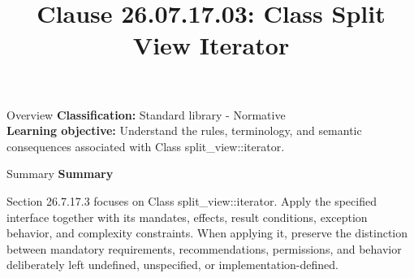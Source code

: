 \documentclass[10pt,letterpaper]{article}
\title{Clause 26.07.17.03: Class Split View Iterator}
\author{}
\date{}
\begin{document}
\maketitle
\begin{CornellOverviewBox}{Overview}
\textbf{Classification:} Standard library - Normative\\[2pt]
\textbf{Learning objective:} Understand the rules, terminology, and semantic consequences associated with Class split\_view::iterator.
\end{CornellOverviewBox}\begin{CornellSummaryBox}{Summary}
{\sffamily\bfseries\color{Accent} Summary}\par\vspace{3pt}Section 26.7.17.3 focuses on Class split\_view::iterator. Apply the specified interface together with its mandates, effects, result conditions, exception behavior, and complexity constraints. When applying it, preserve the distinction between mandatory requirements, recommendations, permissions, and behavior deliberately left undefined, unspecified, or implementation-defined.
\end{CornellSummaryBox}
\end{document}
